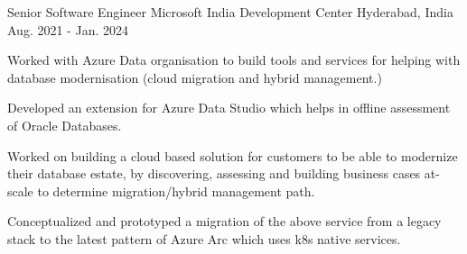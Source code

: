 \begin{cventries}
\cventry
    {Senior Software Engineer} %
    {Microsoft India Development Center} %
    {Hyderabad, India} %
    {Aug. 2021 - Jan. 2024} %
    {
      \begin{cvitems} %
        \item {Worked with Azure Data organisation to build tools and services for helping with database modernisation (cloud migration and hybrid management.)}
        \item {Developed an extension for Azure Data Studio which helps in offline assessment of Oracle Databases.}
        \item {Worked on building a cloud based solution for customers to be able to modernize their database estate, by discovering, assessing and building business cases at-scale to determine migration/hybrid management path.}
        \item {Conceptualized and prototyped a migration of the above service from a legacy stack to the latest pattern of Azure Arc which uses k8s native services.}
      \end{cvitems}
    }


\end{cventries}
